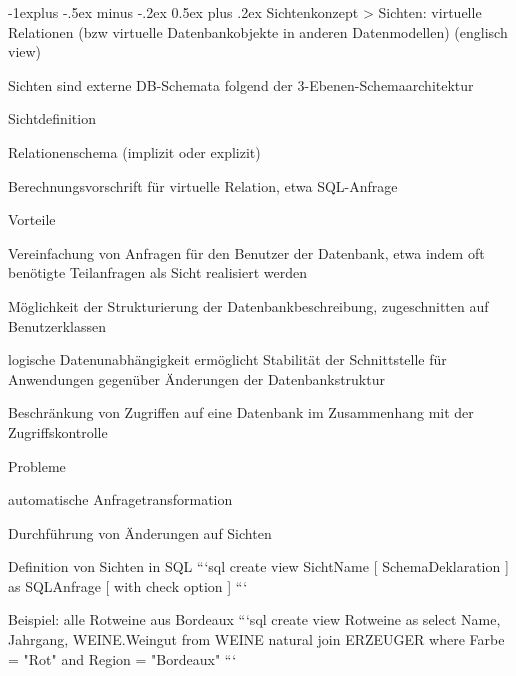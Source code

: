 \documentclass[a4paper]{article}
\makeatletter
\renewcommand{\subsection}{\@startsection{subsection}{2}{0mm}%
                                {-1explus -.5ex minus -.2ex}%
                                {0.5ex plus .2ex}%
                                {\normalfont\normalsize\bfseries}}
\makeatother
\begin{document}
\begin{multicols}{3}
\begin{itemize*}
    \subsection{Sichtenkonzept}
    > Sichten: virtuelle Relationen (bzw virtuelle Datenbankobjekte in anderen Datenmodellen) (englisch view)
    \begin{itemize*}
        \item Sichten sind externe DB-Schemata folgend der 3-Ebenen-Schemaarchitektur
        \begin{itemize*}
            \item Sichtdefinition
            \item Relationenschema (implizit oder explizit)
            \item Berechnungsvorschrift für virtuelle Relation, etwa SQL-Anfrage
        \end{itemize*}
        \item Vorteile
        \begin{itemize*}
            \item Vereinfachung von Anfragen für den Benutzer der Datenbank, etwa indem oft benötigte Teilanfragen als Sicht realisiert werden
            \item Möglichkeit der Strukturierung der Datenbankbeschreibung, zugeschnitten auf Benutzerklassen
            \item logische Datenunabhängigkeit ermöglicht Stabilität der Schnittstelle für Anwendungen gegenüber Änderungen der Datenbankstruktur
            \item Beschränkung von Zugriffen auf eine Datenbank im Zusammenhang mit der Zugriffskontrolle
        \end{itemize*}
        \item Probleme
        \begin{itemize*}
            \item automatische Anfragetransformation
            \item Durchführung von Änderungen auf Sichten
        \end{itemize*}
        \item Definition von Sichten in SQL
        ```sql
        create view SichtName [ SchemaDeklaration ]
        as SQLAnfrage
            [ with check option ]
        ```
        \item Beispiel: alle Rotweine aus Bordeaux
        ```sql
        create view Rotweine as
        select Name, Jahrgang, WEINE.Weingut
        from WEINE natural join ERZEUGER
        where Farbe = "Rot" and Region = "Bordeaux"
        ```
    \end{itemize*}


\end{itemize*}
\end{multicols}
\end{document}
